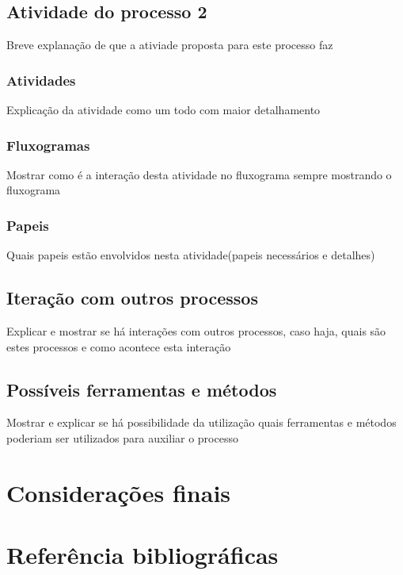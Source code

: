 \documentclass{article}
\begin{document}
	\subsection{Atividade do processo 2}
		Breve explanação de que a ativiade proposta para este processo faz
		
		\subsubsection{Atividades}
			Explicação da atividade como um todo com maior detalhamento
		\subsubsection{Fluxogramas}
			Mostrar como é a interação desta atividade no fluxograma sempre mostrando o fluxograma
		\subsubsection{Papeis}
			Quais papeis estão envolvidos nesta atividade(papeis necessários e detalhes)

	\subsection{Iteração com outros processos}		
		Explicar e mostrar se há interações com outros processos, caso haja, quais são estes processos e como acontece esta interação
	
	\subsection{Possíveis ferramentas e métodos}
		Mostrar e explicar se há possibilidade da utilização quais ferramentas e métodos poderiam ser utilizados para auxiliar o processo


	
\section{Considerações finais}

\section{Referência bibliográficas}
\end{document}
